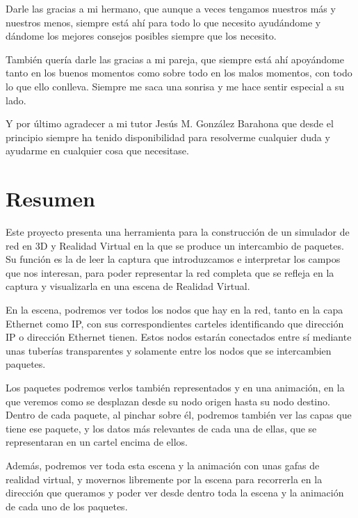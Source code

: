 \documentclass[a4paper, 12pt]{book}
\begin{document}
Darle las gracias a mi hermano, que aunque a veces tengamos nuestros más y nuestros menos, siempre está ahí para todo lo que necesito ayudándome y dándome los mejores consejos posibles siempre que los necesito.

También quería darle las gracias a mi pareja, que siempre está ahí apoyándome tanto en los buenos momentos como sobre todo en los malos momentos, con todo lo que ello conlleva. Siempre me saca una sonrisa y me hace sentir especial a su lado.

Y por último agradecer a mi tutor Jesús M. González Barahona que desde el principio siempre ha tenido disponibilidad para resolverme cualquier duda y ayudarme en cualquier cosa que necesitase.

\chapter*{Resumen}


Este proyecto presenta una herramienta para la construcción de un simulador de red en 3D y Realidad Virtual en la que se produce un intercambio de paquetes. Su función es la de leer la captura que introduzcamos e interpretar los campos que nos interesan, para poder representar la red completa que se refleja en la captura y visualizarla en una escena de Realidad Virtual.

En la escena, podremos ver todos los nodos que hay en la red, tanto en la capa Ethernet como IP, con sus correspondientes carteles identificando que dirección IP o dirección Ethernet tienen.
Estos nodos estarán conectados entre sí mediante unas tuberías transparentes y solamente entre los nodos que se intercambien paquetes.

Los paquetes podremos verlos también representados y en una animación, en la que veremos como se desplazan desde su nodo origen hasta su nodo destino. Dentro de cada paquete, al pinchar sobre él, podremos también ver las capas que tiene ese paquete, y los datos más relevantes de cada una de ellas, que se representaran en un cartel encima de ellos.

Además, podremos ver toda esta escena y la animación con unas gafas de realidad virtual, y movernos libremente por la escena para recorrerla en la dirección que queramos y poder ver desde dentro toda la escena y la animación de cada uno de los paquetes.
\end{document}
